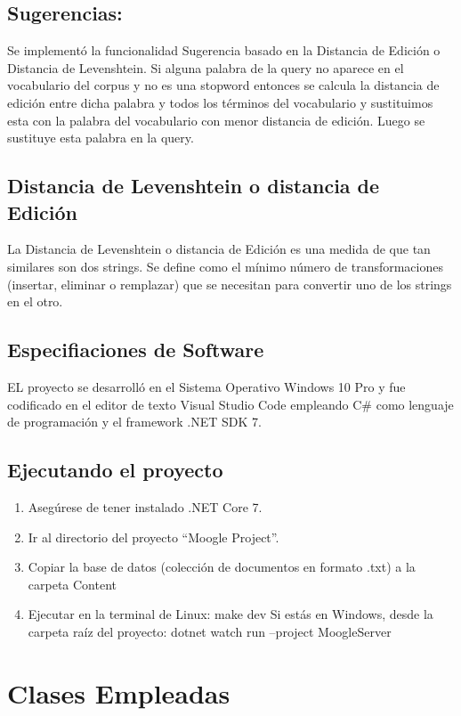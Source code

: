 \documentclass[a4paper,12pt,twocolumn]{article}
\begin{document}
\subsection{Sugerencias:}
Se implementó la funcionalidad Sugerencia basado en la Distancia de Edición o Distancia de
Levenshtein. Si alguna palabra de la query no aparece en el vocabulario del corpus y no es una
stopword entonces se calcula la distancia de edición entre dicha palabra y todos los términos
del vocabulario y sustituimos esta con la palabra del vocabulario con menor distancia de edición.
Luego se sustituye esta palabra en la query.
\subsection{Distancia de Levenshtein o distancia de Edición}
La Distancia de Levenshtein o distancia de Edición es una medida de que tan similares son dos
strings. Se define como el mínimo número de transformaciones (insertar, eliminar o remplazar)
que se necesitan para convertir uno de los strings en el otro.

\subsection{Especifiaciones de Software}
EL proyecto se desarrolló en el Sistema Operativo Windows 10 Pro y fue codificado en el editor
de texto Visual Studio Code empleando C# como lenguaje de programación y el framework
.NET SDK 7. 

\subsection{Ejecutando el proyecto}
\begin{enumerate}   
\item Asegúrese de tener instalado .NET Core 7.
\item Ir al directorio del proyecto “Moogle Project”.
\item Copiar la base de datos (colección de documentos en formato .txt) a la carpeta Content
\item Ejecutar en la terminal de Linux:
        make dev
    Si estás en Windows, desde la carpeta raíz del proyecto:
    dotnet watch run --project MoogleServer
\end{enumerate}


\section{Clases Empleadas}\label{sec: classes}
\end{document}
